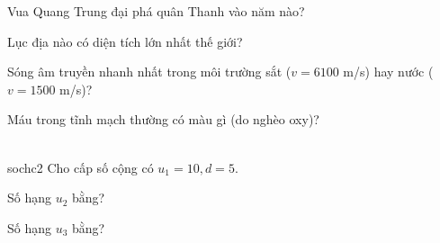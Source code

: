 \begin{ex}
    Vua Quang Trung đại phá quân Thanh vào năm nào?
\end{ex}

\begin{ex}
    Lục địa nào có diện tích lớn nhất thế giới?

\end{ex}

\begin{ex}
    Sóng âm truyền nhanh nhất trong môi trường sắt ($v = 6100$ m/s) hay nước ($v = 1500$ m/s)?
\end{ex}

\begin{ex}
    Máu trong tĩnh mạch thường có màu gì (do nghèo oxy)?
\end{ex}

\begin{ex}
    \\sochc{2}{
        Cho cấp số cộng có $u_1 = 10, d = 5$.
    }
    \begin{chc}
        Số hạng $u_2$ bằng?
    \end{chc}
    \begin{chc}
        Số hạng $u_3$ bằng?
    \end{chc}
\end{ex}